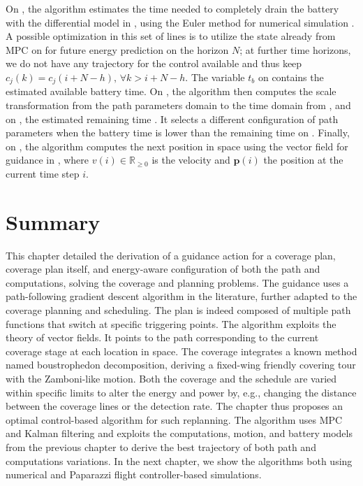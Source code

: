 On , the algorithm estimates the time needed to completely drain the battery with the differential model in 
, using the Euler method for numerical simulation %
. A possible optimization in this set of lines is to utilize the state already from MPC on  for future energy prediction on the horizon $N$; at further time horizons, we do not have any trajectory for the control available and thus keep  $c_j(k)=c_j(i+N-h),\,\forall k>i+N-h$. The variable $t_b$ on  contains the estimated available battery time. On , the algorithm then computes the scale transformation from the path parameters domain to the time domain from , and on , the estimated remaining time%
. It selects a different configuration of path parameters when the battery time is lower than the remaining time on . 
Finally, on , the algorithm computes the next position in space using the vector field for guidance in , where $v(i)\in\mathbb{R}_{\geq 0}$ is the velocity and $\mathbf{p}(i)$ the position at the current time step $i$. 



\section{Summary}

This chapter detailed the derivation of a guidance action for a coverage plan, coverage plan itself, and energy-aware configuration of both the path and computations, solving the coverage and planning problems. The guidance uses a path-following gradient descent algorithm in the literature, further adapted to the coverage planning and scheduling. The plan is indeed composed of multiple path functions that switch at specific triggering points. The algorithm exploits the theory of vector fields. It points to the path corresponding to the current coverage stage at each location in space. The coverage integrates a known method named boustrophedon decomposition, deriving a fixed-wing friendly covering tour with the Zamboni-like motion. Both the coverage and the schedule are varied within specific limits to alter the energy and power by, e.g., changing the distance between the coverage lines or the detection rate. The chapter thus proposes an optimal control-based algorithm for such replanning. The algorithm uses MPC and Kalman filtering and exploits the computations, motion, and battery models from the previous chapter to derive the best trajectory of both path and computations variations. In the next chapter, we show the algorithms both using numerical and Paparazzi flight controller-based simulations.

